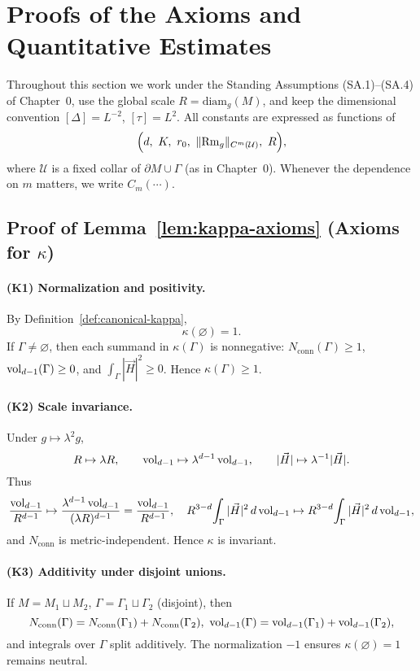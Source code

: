 \section{Proofs of the Axioms and Quantitative Estimates}
\label{sec:kappa-axioms-proofs}

Throughout this section we work under the Standing Assumptions (SA.1)–(SA.4) of Chapter~0,
use the global scale $R=\mathrm{diam}_g(M)$, and keep the dimensional convention
$[\Delta]=L^{-2}$, $[\tau]=L^2$. All constants are expressed as functions of
\[
\Big(d,\ K,\ r_0,\ \|{\rm Rm}_g\|_{C^m(\mathcal{U})},\ R\Big),
\]
where $\mathcal{U}$ is a fixed collar of $\partial M\cup\Gamma$ (as in Chapter~0).
Whenever the dependence on $m$ matters, we write $C_m(\cdots)$.

\subsection{Proof of Lemma~\ref{lem:kappa-axioms} (Axioms for $\kappa$)}
\label{subsec:axioms-proof}

\paragraph{(K1) Normalization and positivity.}
By Definition~\ref{def:canonical-kappa},
\[
\kappa(\varnothing)=1.
\]
If $\Gamma\neq\varnothing$, then each summand in $\kappa(\Gamma)$ is nonnegative:
$N_{\mathrm{conn}}(\Gamma)\ge 1$, $\operatorname{vol}_{d-1}(\Gamma)\ge 0$, and $\int_\Gamma |\vec H|^2\ge 0$.
Hence $\kappa(\Gamma)\ge 1$.

\paragraph{(K2) Scale invariance.}
Under $g\mapsto \lambda^2 g$,
\[
R\mapsto \lambda R, \qquad \operatorname{vol}_{d-1}\mapsto \lambda^{d-1}\operatorname{vol}_{d-1},\qquad |\vec H|\mapsto \lambda^{-1}|\vec H|.
\]
Thus
\[
\frac{\operatorname{vol}_{d-1}}{R^{d-1}}\mapsto \frac{\lambda^{d-1}\operatorname{vol}_{d-1}}{(\lambda R)^{d-1}}=\frac{\operatorname{vol}_{d-1}}{R^{d-1}},\quad
R^{3-d}\!\int_\Gamma |\vec H|^2\,d\operatorname{vol}_{d-1}\mapsto R^{3-d}\!\int_\Gamma |\vec H|^2\,d\operatorname{vol}_{d-1},
\]
and $N_{\mathrm{conn}}$ is metric-independent. Hence $\kappa$ is invariant.

\paragraph{(K3) Additivity under disjoint unions.}
If $M=M_1\sqcup M_2$, $\Gamma=\Gamma_1\sqcup\Gamma_2$ (disjoint), then
\[
N_{\mathrm{conn}}(\Gamma)=N_{\mathrm{conn}}(\Gamma_1)+N_{\mathrm{conn}}(\Gamma_2),\ 
\vol_{d-1}(\Gamma)=\vol_{d-1}(\Gamma_1)+\vol_{d-1}(\Gamma_2),
\]
and integrals over $\Gamma$ split additively. The normalization $-1$ ensures $\kappa(\varnothing)=1$ remains neutral.


